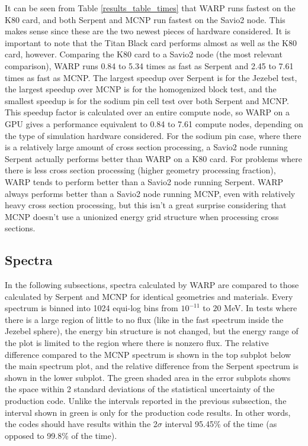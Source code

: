 \documentclass[preprint,12pt]{elsarticle}
\begin{document}
It can be seen from Table \ref{results_table_times} that WARP runs fastest on the K80 card, and both Serpent and MCNP run fastest on the Savio2 node.  This makes sense since these are the two newest pieces of hardware considered.  It is important to note that the Titan Black card performs almost as well as the K80 card, however.  Comparing the K80 card to a Savio2 node (the most relevant comparison), WARP runs 0.84 to 5.34 times as fast as Serpent and 2.45 to 7.61 times as fast as MCNP.   The largest speedup over Serpent is for the Jezebel test, the largest speedup over MCNP is for the homogenized block test, and the smallest speedup is for the sodium pin cell test over both Serpent and MCNP.  This speedup factor is calculated over an entire compute node, so WARP on a GPU gives a performance equivalent to 0.84 to 7.61 compute nodes, depending on the type of simulation hardware considered.  For the sodium pin case, where there is a relatively large amount of cross section processing, a Savio2 node running Serpent actually performs better than WARP on a K80 card.  For problems where there is less cross section processing (higher geometry processing fraction), WARP tends to perform better than a Savio2 node running Serpent.  WARP always performs better than a Savio2 node running MCNP, even with relatively heavy cross section processing, but this isn't a great surprise considering that MCNP doesn't use a unionized energy grid structure when processing cross sections.


\subsection{Spectra}

In the following subsections, spectra calculated by WARP are compared to those calculated by Serpent and MCNP for identical geometries and materials.  Every spectrum is binned into 1024 equi-log bins from $10^{-11}$ to $20$ MeV.  In tests where there is a large region of little to no flux (like in the fast spectrum inside the Jezebel sphere), the energy bin structure is not changed, but the energy range of the plot is limited to the region where there is nonzero flux.  The relative difference compared to the MCNP spectrum is shown in the top subplot below the main spectrum plot, and the relative difference from the Serpent spectrum is shown in the lower subplot.  The green shaded area in the error subplots shows the space within 2 standard deviations of the statistical uncertainty of the production code.  Unlike the intervals reported in the previous subsection, the interval shown in green is only for the production code results.  In other words, the codes should have results within the 2$\sigma$ interval 95.45\% of the time (as opposed to 99.8\% of the time).
\end{document}
